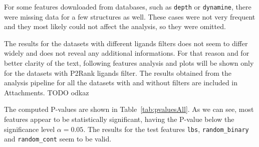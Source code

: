 For some features downloaded from databases, such as \texttt{depth} or \texttt{dynamine}, there were missing data for a few structures as well. These cases were not very frequent and they most likely could not affect the analysis, so they were omitted.

The results for the datasets with different ligands filters does not seem to differ widely and does not reveal any additional informations. For that reason and for better clarity of the text, following features analysis and plots will be shown only for the datasets with P2Rank ligands filter. The results obtained from the analysis pipeline for all the datasets with and without filters are included in Attachments. TODO odkaz

The computed P-values are shown in Table~\ref{tab:pvaluesAll}. As we can see, most features appear to be statistically significant, having the P-value below the significance level $\alpha=0.05$. The results for the test features \texttt{lbs}, \texttt{random\_binary} and \texttt{random\_cont} seem to be valid. 


